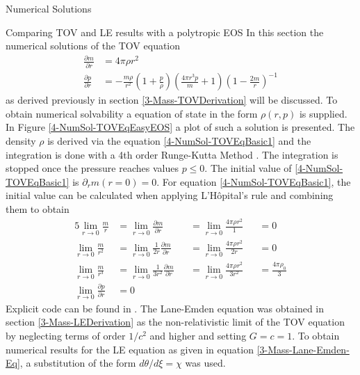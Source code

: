 \begin{section}{Numerical Solutions}
\begin{subsection}{Comparing TOV and LE results with a polytropic EOS}
In this section the numerical solutions of the \ac{TOV} equation
\begin{align}
	\frac{\partial m}{\partial r} &= 4\pi\rho r^2\label{4-NumSol-TOVEqBasic1}\\
	\frac{\partial p}{\partial r} &=-\frac{m\rho}{r^2}\left(1+\frac{p}{\rho}\right)\left(\frac{4\pi r^3p}{m}+1\right)\left(1-\frac{2m}{r}\right)^{-1}
	\label{4-NumSol-TOVEqBasic2}
\end{align}
as derived previously in section \ref{3-Mass-TOVDerivation} will be discussed. To obtain numerical solvability a equation of state in the form $\rho(r,p)$ is supplied. 
In Figure \ref{4-NumSol-TOVEqEasyEOS} a plot of such a solution is presented.
The density $\rho$ is derived via the equation \eqref{4-NumSol-TOVEqBasic1} and the integration is done with a 4th order Runge-Kutta Method \cite{rungeUeberNumerischeAufloesung1895, schlömilch1901zeitschrift, h.SimplifiedDerivationAnalysis2010}.
The integration is stopped once the pressure reaches values $p\leq0$. The initial value of \eqref{4-NumSol-TOVEqBasic1} is $\partial_r m(r=0)=0$. For equation \eqref{4-NumSol-TOVEqBasic1}, the initial value can be calculated when applying L'Hôpital's rule and combining them to obtain
\begin{alignat}{5}
	\lim\limits_{r\rightarrow0}\frac{m}{r} &= \lim\limits_{r\rightarrow0}\frac{\partial m}{\partial r} &&=\lim\limits_{r\rightarrow0}\frac{4\pi\rho r^2}{1} &&= 0\\
	\lim\limits_{r\rightarrow0}\frac{m}{r^2} &= \lim\limits_{r\rightarrow0}\frac{1}{2r}\frac{\partial m}{\partial r}  &&= \lim\limits_{r\rightarrow0}\frac{4\pi\rho r^2}{2r} &&= 0\\
	\lim\limits_{r\rightarrow0}\frac{m}{r^3} &= \lim\limits_{r\rightarrow0}\frac{1}{3r^2}\frac{\partial m}{\partial r} &&=\lim\limits_{r\rightarrow0}\frac{4\pi\rho r^2}{3r^2} &&= \frac{4\pi\rho_0}{3}\\
	\lim\limits_{r\rightarrow0}\frac{\partial p}{\partial r} &= 0
\end{alignat}
Explicit code can be found in \cite{pleyerGithubRepositoryJonas2021}. The Lane-Emden equation was obtained in section \ref{3-Mass-LEDerivation} as the non-relativistic limit of the \ac{TOV} equation by neglecting terms of order $1/c^2$ and higher and setting $G=c=1$. To obtain numerical results for the \ac{LE} equation as given in equation \eqref{3-Mass-Lane-Emden-Eq}, a substitution of the form $d\theta/d\xi=\chi$ was used.

\end{subsection}
\end{section}
